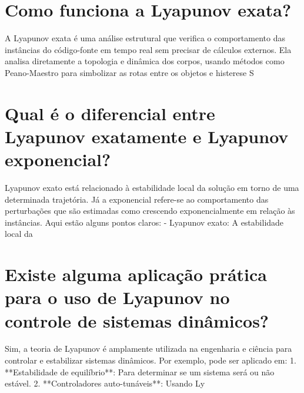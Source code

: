 \documentclass[11pt,a4paper]{article}
\begin{document}
\section{Como funciona a Lyapunov exata?}
A Lyapunov exata é uma análise estrutural que verifica o comportamento das instâncias do código-fonte em tempo real sem precisar de cálculos externos. Ela analisa diretamente a topologia e dinâmica dos corpos, usando métodos como Peano-Maestro para simbolizar as rotas entre os objetos e histerese S

\section{Qual é o diferencial entre Lyapunov exatamente e Lyapunov exponencial?}
Lyapunov exato está relacionado à estabilidade local da solução em torno de uma determinada trajetória. Já a exponencial refere-se ao comportamento das perturbações que são estimadas como crescendo exponencialmente em relação às instâncias. Aqui estão alguns pontos claros: - Lyapunov exato: A estabilidade local da

\section{Existe alguma aplicação prática para o uso de Lyapunov no controle de sistemas dinâmicos?}
Sim, a teoria de Lyapunov é amplamente utilizada na engenharia e ciência para controlar e estabilizar sistemas dinâmicos. Por exemplo, pode ser aplicado em: 1. **Estabilidade de equilíbrio**: Para determinar se um sistema será ou não estável. 2. **Controladores auto-tunáveis**: Usando Ly
\end{document}
